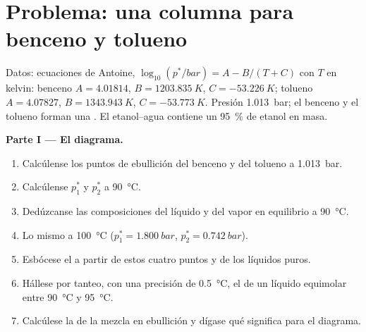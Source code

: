 \section{Problema: una columna para benceno y tolueno}

\begin{problem}
\label{pb:b2:liquid-vapour-diagrams:1}
Datos: ecuaciones de Antoine, $\log_{10}(p^*/\unit{bar}) = A - B/(T + C)$ con $T$ en
kelvin: benceno $A = 4.01814$, $B = \qty{1203.835}{K}$, $C =
\qty{-53.226}{K}$; tolueno $A = 4.07827$, $B = \qty{1343.943}{K}$, $C =
\qty{-53.773}{K}$. Presión \qty{1.013}{bar}; el benceno y el tolueno forman una . El  etanol--agua contiene un 95~\% de etanol en masa.

\medskip
\noindent\textbf{Parte I --- El diagrama.}
\begin{enumerate}
  \item Calcúlense los puntos de ebullición del benceno y del tolueno a \qty{1.013}{bar}.
  \item Calcúlense $p_1^*$ y $p_2^*$ a \qty{90}{\degreeCelsius}.
  \item Dedúzcanse las composiciones del líquido y del vapor en equilibrio
        a \qty{90}{\degreeCelsius}.
  \item Lo mismo a \qty{100}{\degreeCelsius} ($p_1^* = \qty{1.800}{bar}$, $p_2^* =
        \qty{0.742}{bar}$).
  \item Esbócese el  a partir de estos cuatro puntos y de los líquidos puros.
  \item Hállese por tanteo, con una precisión de
        \qty{0.5}{\degreeCelsius}, el  de un líquido equimolar entre \qty{90}{\degreeCelsius} y
        \qty{95}{\degreeCelsius}.
  \item Calcúlese la  de la mezcla en ebullición y dígase qué significa para
        el diagrama.
\end{enumerate}


\end{problem}
